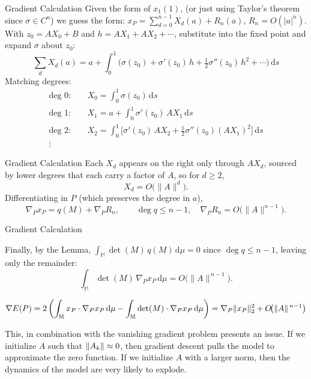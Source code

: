 \documentclass[aspectratio=169]{beamer}
\DeclarePairedDelimiter{\norm}{\lVert}{\rVert}
\begin{document}
\begin{frame}{Gradient Calculation}
Given the form of $x_1(1)$, (or just using Taylor's theorem since $\sigma\in C^n$) we guess the form:
$x_P=\sum_{d=0}^{n-1} X_d(a) + R_n(a)$, $R_n=O(|a|^n)$. With $z_0=AX_0+B$ and $h=AX_1+AX_2+\cdots$,
substitute into the fixed point and expand $\sigma$ about $z_0$:
\[
\sum_d X_d(a) = a + \int_0^1\Big(\sigma(z_0)+\sigma'(z_0)\,h+\tfrac12\sigma''(z_0)\,h^2+\cdots\Big)\,\mathrm{d}s
\]
Matching degrees:
\begin{align*}
\text{deg }0:&\quad X_0 = \int_0^1\sigma(z_0)\,\mathrm{d}s \\
\text{deg }1:&\quad X_1 = a + \int_0^1\sigma'(z_0)\,AX_1\,\mathrm{d}s\\
\text{deg }2:&\quad X_2 = \int_0^1\big[\sigma'(z_0)\,AX_2+\tfrac12\sigma''(z_0)(AX_1)^2\big]\,\mathrm{d}s\\
\vdots
\end{align*}
\end{frame}

\begin{frame}{Gradient Calculation}
Each $X_d$ appears on the right only through $AX_d$, sourced by lower degrees that each carry a
factor of $A$, so for $d\ge2$,
\[
X_d = O\big(\|A\|^{d}\big).
\]
Differentiating in $P$ (which preserves the degree in $a$),
\[
\nabla_P x_P = q(M) + \nabla_P R_n,\qquad \deg q\le n-1,\quad \nabla_P R_n = O\big(\|A\|^{n-1}\big).
\]

\end{frame}

\begin{frame}{Gradient Calculation}

Finally, by the Lemma, $\int_\mathbb{M} \det(M)\,q(M)\,\mathrm{d}\mu = 0$ since $\deg q\le n-1$, leaving only the remainder:
\[
\int_\mathbb{M}\det(M)\,\nabla_P x_P\,\mathrm{d}\mu= O\big(\|A\|^{\,n-1}\big).
\]

\begin{equation*}
\nabla E(P) = 2 \left( \int_\mathbb{M} x_P \cdot \nabla_{P} x_P \,\mathrm{d}\mu
   - \int_\mathbb{M} \det(M) \cdot \nabla_{P} x_P \,\mathrm{d}\mu \right)
   = \nabla_{P} \norm{x_P}_2^2 + O\!\big(\|A\|^{\,n-1}\big)
\end{equation*}

\medskip

This, in combination with the vanishing gradient problem presents an issue. If we initialize $A$ such that $\norm{A_k} \approx 0$, then gradient descent pulls the model to approximate the zero function. If we initialize $A$ with a larger norm, then the dynamics of the model are very likely to explode.
\end{frame}
\end{document}
